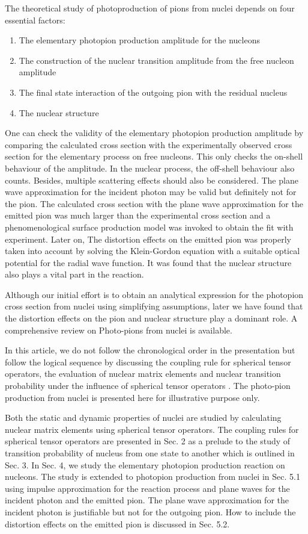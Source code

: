 The theoretical study of photoproduction of pions from nuclei depends on four essential factors:
\begin{enumerate}
\item The elementary photopion production amplitude for the nucleons
\item The construction of the nuclear transition amplitude from the free nucleon amplitude
\item The final state interaction of the outgoing pion with the residual nucleus
\item The nuclear structure
\end{enumerate}

One can check the validity of the elementary photopion production amplitude by comparing the calculated cross section with the experimentally observed cross section for the elementary process on free nucleons. This only checks the on-shell behaviour of the amplitude. In the nuclear process, the off-shell behaviour also counts. Besides, multiple scattering effects should also be considered. The plane wave approximation for the incident photon may be valid but definitely not for the pion. The calculated cross section with the plane wave approximation for the emitted pion was much larger than the experimental cross section and a phenomenological surface production model \cite{key19} was invoked to obtain the fit with experiment. Later on, The distortion effects on the emitted pion \cite{key20,key21} was properly taken into account by solving the Klein-Gordon equation with a suitable optical potential for the radial wave function. It was found that the nuclear structure also plays a vital part in the reaction.

Although our initial effort is to obtain an analytical expression for the photopion cross section from nuclei using simplifying assumptions, later we have found that the distortion effects on the pion and nuclear structure play a dominant role. A comprehensive review \cite{key22} on Photo-pions from nuclei is available. 

In this article, we do not follow the chronological order in the presentation but follow the logical sequence by discussing the coupling rule for spherical tensor operators, the evaluation of nuclear matrix elements and nuclear transition probability under the influence of spherical tensor operators \cite{key12}. The photo-pion production from nuclei is presented here for illustrative purpose only.

Both the static and dynamic properties of nuclei are studied by calculating nuclear matrix elements using spherical tensor operators. The coupling rules for spherical tensor operators are presented in Sec. 2 as a prelude to the study of transition probability of nucleus from one state to another which is outlined in Sec. 3. In Sec. 4, we study the elementary photopion production reaction on nucleons. The study is extended to photopion production from nuclei in Sec. 5.1 using impulse approximation for the reaction process and plane waves for the incident photon and the emitted pion. The plane wave approximation for the incident photon is justifiable but not for the outgoing pion. How to include the distortion effects on the emitted pion is discussed in Sec. 5.2.

